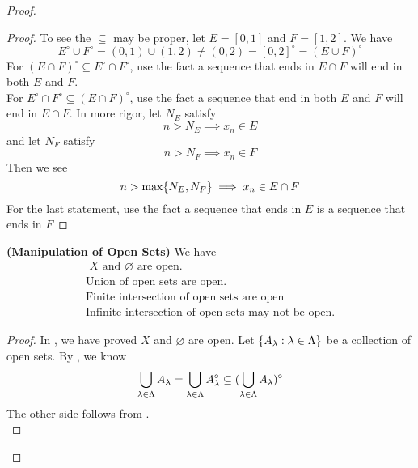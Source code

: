 \documentclass{report}
\begin{document}
\begin{proof}
\begin{proof}
To see the $\subseteq$ may be proper, let $E=[0,1]$ and $F=[1,2]$. We have
\begin{equation}
E^\circ \cup F^\circ= (0,1)\cup (1,2)\neq (0,2)=[0,2]^\circ =(E\cup F)^\circ 
\end{equation}
For $(E\cap F)^\circ \subseteq E^\circ \cap F^\circ $, use the fact a sequence that ends in $E\cap F$ will end in both $E$ and  $F$.\\

For $E^\circ \cap F^\circ \subseteq (E\cap F)^\circ $, use the fact a sequence that end in both $E$ and  $F$ will end in  $E\cap F$. In more rigor, let $N_E$ satisfy
 \begin{equation}
n>N_E\implies x_n\in E
\end{equation}
and let $N_F$ satisfy
\begin{equation}
n>N_F\implies x_n\in F
\end{equation}
Then we see
\begin{equation}
n>\max \{ N_E,N_F \}\implies x_n\in E\cap F
\end{equation}
For the last statement, use the fact a sequence that ends in $E$ is a sequence that ends in  $F$
\end{proof}
\begin{theorem}
\label{3.3.5}
\textbf{(Manipulation of Open Sets)} We have
\begin{gather}
\text{ $X$ and  $\varnothing$ are open. }\\
\text{ Union of open sets are open. }\\
\text{ Finite intersection of open sets are open}\\
\text{ Infinite intersection of open sets may not be open. }
\end{gather}
\end{theorem}
\begin{proof}
In , we have proved $X$ and $\varnothing$ are open. Let $\{ A_\lambda :\lambda \in\Lambda  \}$ be a collection of open sets. By , we know
\begin{equation}
\bigcup_{\lambda \in \Lambda } A_\lambda= \bigcup_{\lambda  \in \Lambda }A_\lambda ^\circ \subseteq (\bigcup_{\lambda  \in \Lambda } A_\lambda )^\circ 
\end{equation}
The other side follows from .\\


\end{proof}
\end{proof}
\end{document}
